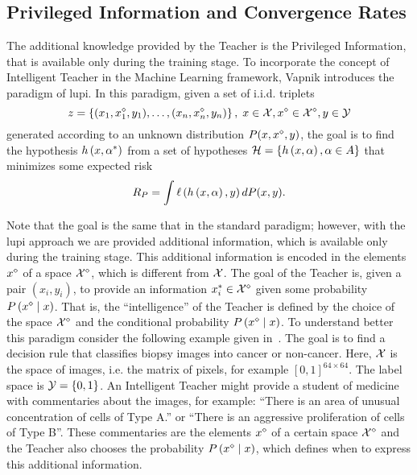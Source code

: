 \subsection{Privileged Information and Convergence Rates}
The additional knowledge provided by the Teacher is the Privileged Information, that is available only during the training stage.
To incorporate the concept of Intelligent Teacher in the Machine Learning framework, Vapnik introduces the paradigm of \acrshort{lupi}.
In this paradigm, given a set of i.i.d. triplets
$$ z = \left\{(x_1, {x}^{\diamond}_1, y_1), \ldots, (x_n,{x}^{\diamond}_n, y_n)\right\}, \; x \in \mathcal{X}, {x}^{\diamond} \in {\mathcal{X}}^{\diamond}, y \in \mathcal{Y} $$
generated according to an unknown distribution $P(x, {x}^{\diamond}, y)$, the goal is to find the hypothesis $h\left(x, {\alpha}^*\right)$ from a set of hypotheses $\mathcal{H} = \left\{h\left(x, \alpha\right), \alpha \in A\right\}$ that minimizes some expected risk 
$$ R_P = \int \ell\left( h\left(x, \alpha\right), y\right) dP(x, y). $$

Note that the goal is the same that in the standard paradigm; however, with the \acrshort{lupi} approach we are provided additional information, which is available only during the training stage. This additional information is encoded in the elements ${x}^{\diamond}$ of a space ${\mathcal{X}}^{\diamond}$, which is different from $\mathcal{X}$. The goal of the Teacher is, given a pair $(x_i, y_i)$, to provide an information $x_i^* \in {\mathcal{X}}^{\diamond}$ given some probability $P\left( {x}^{\diamond} \;\middle\vert\; x \right)$. That is, the ``intelligence'' of the Teacher is defined by the choice of the space ${\mathcal{X}}^{\diamond}$ and the conditional probability $P\left( {x}^{\diamond} \;\middle\vert\; x \right)$. 
To understand better this paradigm consider the following example given in~\cite{VapnikI15a}.
 The goal is to find a decision rule that classifies biopsy images into cancer or non-cancer. Here, $\mathcal{X}$ is the space of images, i.e. the matrix of pixels, for example $[0, 1]^{64 \times 64}$. The label space is $\mathcal{Y} = \left\{0, 1\right\}$. An Intelligent Teacher might provide a student of medicine with commentaries about the images, for example: ``There is an area of unusual concentration of cells of Type A.'' or ``There is an aggressive proliferation of cells of Type B''. These commentaries are the elements ${x}^{\diamond}$ of a certain space ${\mathcal{X}}^{\diamond}$ and the Teacher also chooses the probability $P\left( {x}^{\diamond} \;\middle\vert\; x \right)$, which defines when to express this additional information.


